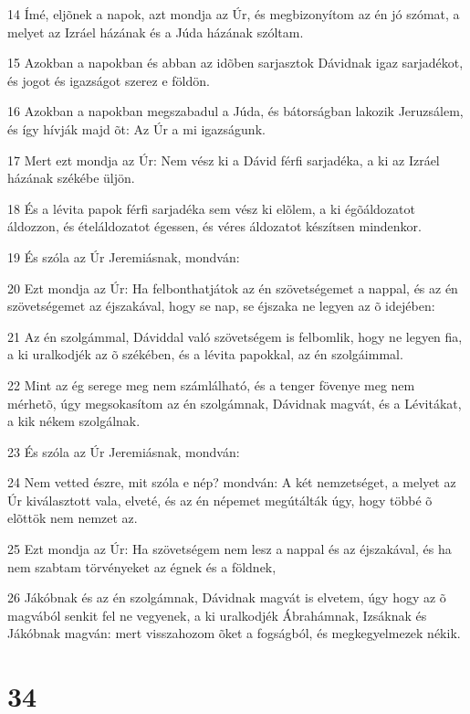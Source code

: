 \par 14 Ímé, eljõnek a napok, azt mondja az Úr, és megbizonyítom az én jó szómat, a melyet az Izráel házának és a Júda házának szóltam.
\par 15 Azokban a napokban és abban az idõben sarjasztok Dávidnak igaz sarjadékot, és jogot és igazságot szerez e földön.
\par 16 Azokban a napokban megszabadul a Júda, és bátorságban lakozik Jeruzsálem, és így hívják majd õt: Az Úr a mi igazságunk.
\par 17 Mert ezt mondja az Úr: Nem vész ki a Dávid férfi sarjadéka, a ki az Izráel házának székébe üljön.
\par 18 És a lévita papok férfi sarjadéka sem vész ki elõlem, a ki égõáldozatot áldozzon, és ételáldozatot égessen, és véres áldozatot készítsen mindenkor.
\par 19 És szóla az Úr Jeremiásnak, mondván:
\par 20 Ezt mondja az Úr: Ha felbonthatjátok az én szövetségemet a nappal, és az én szövetségemet az éjszakával, hogy se nap, se éjszaka ne legyen az õ idejében:
\par 21 Az én szolgámmal, Dáviddal való szövetségem is felbomlik, hogy ne legyen fia, a ki uralkodjék az õ székében, és a lévita papokkal, az én szolgáimmal.
\par 22 Mint az ég serege meg nem számlálható, és a tenger fövenye meg nem mérhetõ, úgy megsokasítom az én szolgámnak, Dávidnak magvát, és a Lévitákat, a kik nékem szolgálnak.
\par 23 És szóla az Úr Jeremiásnak, mondván:
\par 24 Nem vetted észre, mit szóla e nép? mondván: A két nemzetséget, a melyet az Úr kiválasztott vala, elveté, és az én népemet megútálták úgy, hogy többé õ elõttök nem nemzet az.
\par 25 Ezt mondja az Úr: Ha szövetségem nem lesz a nappal és az éjszakával, és ha nem szabtam törvényeket az égnek és a földnek,
\par 26 Jákóbnak és az én szolgámnak, Dávidnak magvát is elvetem, úgy hogy az õ magvából senkit fel ne vegyenek, a ki uralkodjék Ábrahámnak, Izsáknak és Jákóbnak magván: mert visszahozom õket a fogságból, és megkegyelmezek nékik.

\chapter{34}

